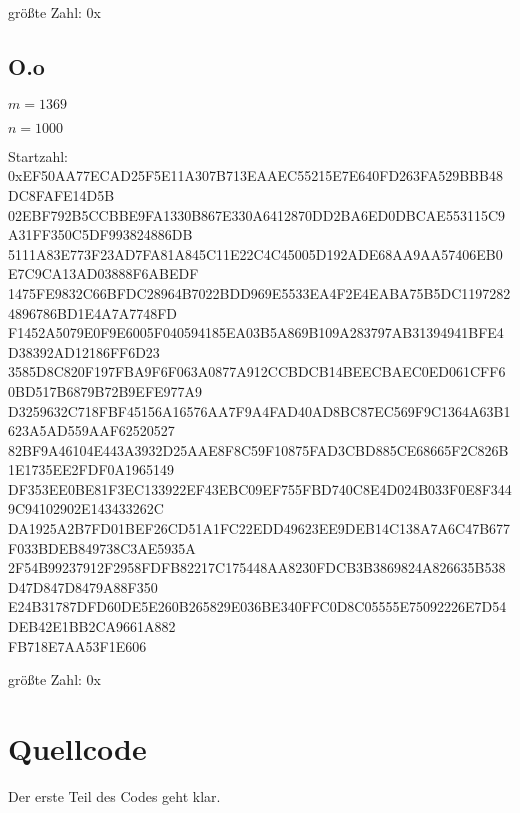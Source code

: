 \documentclass[a4paper,10pt,ngerman]{scrartcl}
\begin{document}
\noindent größte Zahl: 0x

\subsection{O.o}

\noindent $m=1369$

\noindent $n=1000$

\noindent Startzahl: 0xEF50AA77ECAD25F5E11A307B713EAAEC55215E7E640FD263FA529BBB48DC8FAFE14D5B\\02EBF792B5CCBBE9FA1330B867E330A6412870DD2BA6ED0DBCAE553115C9A31FF350C5DF993824886DB\\5111A83E773F23AD7FA81A845C11E22C4C45005D192ADE68AA9AA57406EB0E7C9CA13AD03888F6ABEDF\\1475FE9832C66BFDC28964B7022BDD969E5533EA4F2E4EABA75B5DC11972824896786BD1E4A7A7748FD\\F1452A5079E0F9E6005F040594185EA03B5A869B109A283797AB31394941BFE4D38392AD12186FF6D23\\3585D8C820F197FBA9F6F063A0877A912CCBDCB14BEECBAEC0ED061CFF60BD517B6879B72B9EFE977A9\\D3259632C718FBF45156A16576AA7F9A4FAD40AD8BC87EC569F9C1364A63B1623A5AD559AAF62520527\\82BF9A46104E443A3932D25AAE8F8C59F10875FAD3CBD885CE68665F2C826B1E1735EE2FDF0A1965149\\DF353EE0BE81F3EC133922EF43EBC09EF755FBD740C8E4D024B033F0E8F3449C94102902E143433262C\\DA1925A2B7FD01BEF26CD51A1FC22EDD49623EE9DEB14C138A7A6C47B677F033BDEB849738C3AE5935A\\2F54B99237912F2958FDFB82217C175448AA8230FDCB3B3869824A826635B538D47D847D8479A88F350\\E24B31787DFD60DE5E260B265829E036BE340FFC0D8C05555E75092226E7D54DEB42E1BB2CA9661A882\\FB718E7AA53F1E606

\noindent größte Zahl: 0x




\section{Quellcode}

Der erste Teil des Codes geht klar.
\end{document}
